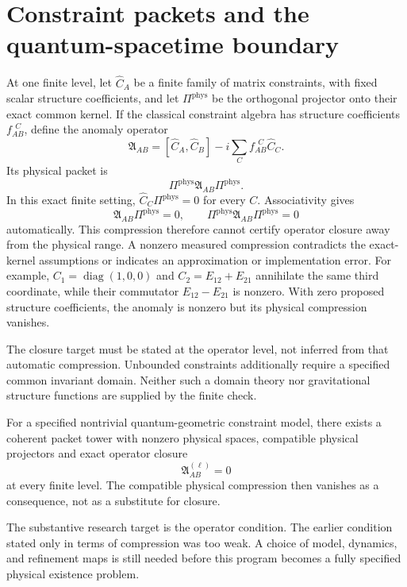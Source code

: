 \section{Constraint packets and the quantum-spacetime boundary}\label{core:section:012}

At one finite level, let $\widehat C_A$ be a finite family of matrix constraints, with fixed scalar structure coefficients, and let $\Pi^{\mathrm{phys}}$ be the orthogonal projector onto their exact common kernel. If the classical constraint algebra has structure coefficients $f_{AB}^{\ \ C}$, define the anomaly operator
\[
\boxed{
\mathfrak A_{AB}
=
[\widehat C_A,\widehat C_B]
-i\sum_C f_{AB}^{\ \ C}\widehat C_C.
}
\]
Its physical packet is
\[
\Pi^{\mathrm{phys}}\mathfrak A_{AB}\Pi^{\mathrm{phys}}.
\]
In this exact finite setting, $\widehat C_C\Pi^{\mathrm{phys}}=0$ for every $C$. Associativity gives
\[
\mathfrak A_{AB}\Pi^{\mathrm{phys}}=0,
\qquad
\Pi^{\mathrm{phys}}\mathfrak A_{AB}\Pi^{\mathrm{phys}}=0
\]
automatically. This compression therefore cannot certify operator closure away from the physical range. A nonzero measured compression contradicts the exact-kernel assumptions or indicates an approximation or implementation error. For example, $C_1=\operatorname{diag}(1,0,0)$ and $C_2=E_{12}+E_{21}$ annihilate the same third coordinate, while their commutator $E_{12}-E_{21}$ is nonzero. With zero proposed structure coefficients, the anomaly is nonzero but its physical compression vanishes.

The closure target must be stated at the operator level, not inferred from that automatic compression. Unbounded constraints additionally require a specified common invariant domain. Neither such a domain theory nor gravitational structure functions are supplied by the finite check.

\begin{conjecture}\label{core:conjecture:001}
For a specified nontrivial quantum-geometric constraint model, there exists a coherent packet tower with nonzero physical spaces, compatible physical projectors and exact operator closure
\[
\mathfrak A^{(\ell)}_{AB}=0
\]
at every finite level. The compatible physical compression then vanishes as a consequence, not as a substitute for closure.
\end{conjecture}
The substantive research target is the operator condition. The earlier condition stated only in terms of compression was too weak. A choice of model, dynamics, and refinement maps is still needed before this program becomes a fully specified physical existence problem.

